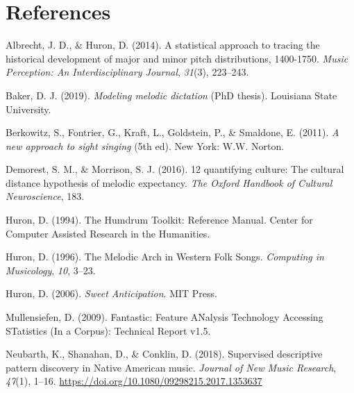 \documentclass[english,man,floatsintext]{apa6}
\begin{document}
\newpage

\hypertarget{references}{%
\section{References}\label{references}}

\begingroup
\setlength{\parindent}{-0.5in}
\setlength{\leftskip}{0.5in}

\hypertarget{refs}{}
\leavevmode\hypertarget{ref-albrecht2014statistical}{}%
Albrecht, J. D., \& Huron, D. (2014). A statistical approach to tracing the historical development of major and minor pitch distributions, 1400-1750. \emph{Music Perception: An Interdisciplinary Journal}, \emph{31}(3), 223--243.

\leavevmode\hypertarget{ref-phdthesis}{}%
Baker, D. J. (2019). \emph{Modeling melodic dictation} (PhD thesis). Louisiana State University.

\leavevmode\hypertarget{ref-berkowitzNewApproachSight2011}{}%
Berkowitz, S., Fontrier, G., Kraft, L., Goldstein, P., \& Smaldone, E. (2011). \emph{A new approach to sight singing} (5th ed). New York: W.W. Norton.

\leavevmode\hypertarget{ref-demorest201612}{}%
Demorest, S. M., \& Morrison, S. J. (2016). 12 quantifying culture: The cultural distance hypothesis of melodic expectancy. \emph{The Oxford Handbook of Cultural Neuroscience}, 183.

\leavevmode\hypertarget{ref-huronHumdrumToolkitReference1994}{}%
Huron, D. (1994). The Humdrum Toolkit: Reference Manual. Center for Computer Assisted Research in the Humanities.

\leavevmode\hypertarget{ref-huronMelodicArchWestern1996}{}%
Huron, D. (1996). The Melodic Arch in Western Folk Songs. \emph{Computing in Musicology}, \emph{10}, 3--23.

\leavevmode\hypertarget{ref-huronSweetAnticipation2006}{}%
Huron, D. (2006). \emph{Sweet Anticipation}. MIT Press.

\leavevmode\hypertarget{ref-mullensiefenFantasticFeatureANalysis2009}{}%
Mullensiefen, D. (2009). Fantastic: Feature ANalysis Technology Accessing STatistics (In a Corpus): Technical Report v1.5.

\leavevmode\hypertarget{ref-neubarthSupervisedDescriptivePattern2018}{}%
Neubarth, K., Shanahan, D., \& Conklin, D. (2018). Supervised descriptive pattern discovery in Native American music. \emph{Journal of New Music Research}, \emph{47}(1), 1--16. \url{https://doi.org/10.1080/09298215.2017.1353637}
\end{document}
